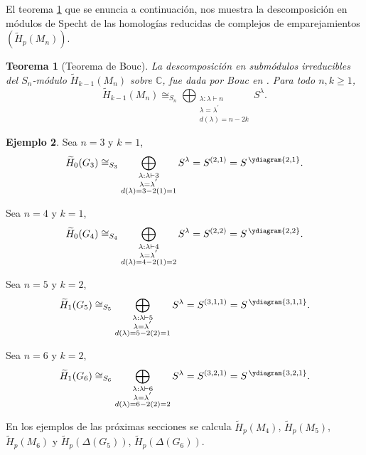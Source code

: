 \documentclass[12pt]{book}
\newtheorem{theorem}{Teorema}[section]
\theoremstyle{definition}
\newtheorem{example}[theorem]{Ejemplo}
\newcounter{in}
\begin{document}
El teorema \ref{bouc} que se enuncia a continuación, nos muestra la descomposición en módulos de
Specht de las homologías reducidas de complejos de emparejamientos $(\widetilde H_{p}(M_{n}))$. 

\begin{theorem}[Teorema de Bouc]
La descomposición en submódulos irreducibles del $S_{n}$-módulo $\widetilde
H_{k-1}(M_{n})$ sobre $\mathbb{C}$, fue dada por Bouc en \cite{MR756517}. Para
todo $n,k\geq1$,
\begin{equation*}
  \widetilde H_{k-1}(M_{n})\cong_{S_{n}}\bigoplus_{\substack{\lambda:\lambda\vdash n\\
      \lambda=\lambda^{'}\\d(\lambda)=n-2k}} S^{\lambda}.
\end{equation*}
\label{bouc}
\end{theorem}

\begin{example}
  \quad

  Sea $n=3$ y $k=1$, 
  \begin{equation*}
    \widetilde H_{0}(G_{3})\cong_{S_{3}}\bigoplus_{\substack{\lambda:\lambda\vdash 3\\
        \lambda=\lambda^{'}\\d(\lambda)=3-2(1)=1}} S^{\lambda}=S^{(2,1)}=S^{\,\ydiagram{2,1}}.
  \end{equation*}
          
  Sea $n=4$ y $k=1$,
  \begin{equation*}
    \widetilde H_{0}(G_{4})\cong_{S_{4}}\bigoplus_{\substack{\lambda:\lambda\vdash 4\\
        \lambda=\lambda^{'}\\d(\lambda)=4-2(1)=2}} S^{\lambda}=S^{(2,2)}=S^{\,\ydiagram{2,2}}.
  \end{equation*}

  Sea $n=5$ y $k=2$,
  \begin{equation*}
    \widetilde H_{1}(G_{5})\cong_{S_{5}}\bigoplus_{\substack{\lambda:\lambda\vdash 5\\
        \lambda=\lambda^{'}\\d(\lambda)=5-2(2)=1}} S^{\lambda}=S^{(3,1,1)}=S^{\,\ydiagram{3,1,1}}.
  \end{equation*}
        
  Sea $n=6$ y $k=2$,
  \begin{equation*}
    \widetilde H_{1}(G_{6})\cong_{S_{6}}\bigoplus_{\substack{\lambda:\lambda\vdash 6\\
        \lambda=\lambda^{'}\\d(\lambda)=6-2(2)=2}} S^{\lambda}=S^{(3,2,1)}=S^{\,\ydiagram{3,2,1}}.
  \end{equation*}
\end{example}
En los ejemplos de las próximas secciones se calcula $\widetilde
H_{p}(M_{4})$, $\widetilde H_{p}(M_{5})$, $\widetilde H_{p}(M_{6})$ y
$\widetilde H_{p}(\Delta(G_{5}))$, $\widetilde H_{p}(\Delta(G_{6}))$.
\end{document}
